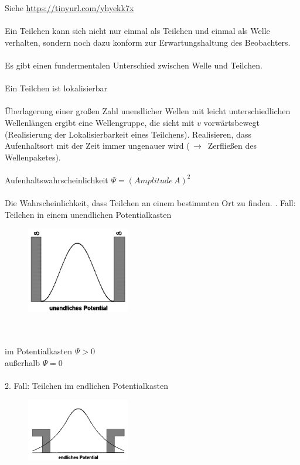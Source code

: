 Siehe \url{https://tinyurl.com/yhyekk7x}
\\
\\
Ein Teilchen kann sich nicht nur einmal als Teilchen und einmal als Welle verhalten, sondern noch dazu konform zur Erwartungshaltung des Beobachters.
\\
\\
Es gibt einen fundermentalen Unterschied zwischen Welle und Teilchen.
\\
\\
{ \color{red} Ein Teilchen ist lokalisierbar}
\\
\\
Überlagerung einer großen Zahl unendlicher Wellen mit leicht unterschiedlichen Wellenlängen ergibt eine Wellengruppe, die sicht mit $v$
vorwärtsbewegt (Realisierung der Lokalisierbarkeit eines Teilchens). Realisieren, dass Aufenhaltsort mit der Zeit immer ungenauer wird
($\,\to\,$ Zerfließen des Wellenpaketes).
\\
\\
Aufenhaltswahrscheinlichkeit \mbox{\Large $ \Psi = (Amplitude\,A)^2$}
\\
\\
Die Wahrscheinlichkeit, dass Teilchen an einem bestimmten Ort zu finden.
. Fall: Teilchen in einem unendlichen Potentialkasten
    \begin{figure}[h]
        \includegraphics[width=0.4\textwidth]{media/unendlichesPotential.png}
        \label{fig:meine-grafik}
    \end{figure}
\\
\\
im Potentialkasten \mbox{\Large $\Psi > 0$}
\\
außerhalb \mbox{\Large $\Psi = 0$}
\\
\\
2. Fall: Teilchen im endlichen Potentialkasten
\\
    \begin{figure}[h]
        \includegraphics[width=0.4\textwidth]{media/endlichesPotential.png}
        \label{fig:meine-grafik}
    \end{figure}
